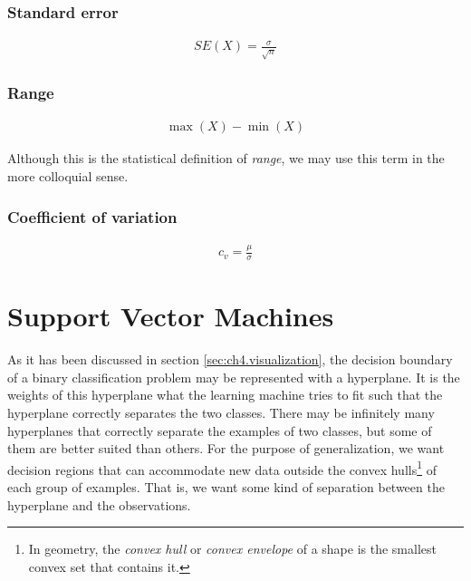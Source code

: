 \subsubsection*{Standard error}
\begin{align*}
    SE(X) = \frac{\sigma}{\sqrt{n}}
\end{align*}

\subsubsection*{Range}
\begin{align*}
    \max(X) - \min(X)
\end{align*}

Although this is the statistical definition of \emph{range}, we may use this term in the more colloquial sense.

\subsubsection*{Coefficient of variation}
\begin{align*}
    c_v = \frac{\mu}{\sigma}
\end{align*}

\section{Support Vector Machines}

As it has been discussed in section \ref{sec:ch4.visualization}, the decision boundary of a binary class\-ification prob\-lem may be represented with a hyperplane. It is the weights of this hyperplane what the learning machine tries to fit such that the hyper\-plane correctly separates the two classes. There may be infinitely many hyperplanes that correctly separate the examples of two classes, but some of them are better suited than others. For the purpose of generalization, we want decision regions that can accommodate new data outside the convex hulls\footnote{In geometry, the \emph{convex hull} or \emph{convex envelope} of a shape is the smallest convex set that contains it.} of each group of examples. That is, we want some kind of separation between the hyperplane and the observations.

